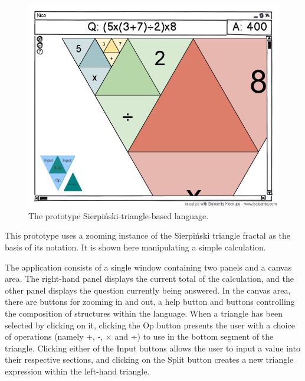\documentclass[12pt,twoside,notitlepage,xetex]{report}
\begin{document}
\begin{figure}[H]
\begin{center}
\includegraphics[width=\textwidth]{figs/mockups/sierp/sierp_mockup_full.png}
\caption{The prototype Sierpiński-triangle-based language.}
\label{fig:ProtoTri}
\end{center}
\end{figure}

This prototype uses a zooming instance of the Sierpiński triangle fractal as
the basis of its notation.  It is shown here manipulating a simple calculation.

The application consists of a single window containing two panels and a canvas
area.  The right-hand panel displays the current total of the calculation,
and the other panel displays the question currently being answered.  In the
canvas area, there are buttons for zooming in and out, a help button and
buttons controlling the composition of structures within the language.  When a
triangle has been selected by clicking on it, clicking the {\sfapp Op} button
presents the user with a choice of operations (namely +, -, × and ÷) to use in
the bottom segment of the triangle.  Clicking either of the {\sfapp Input}
buttons allows the user to input a value into their respective sections, and
clicking on the {\sfapp Split} button creates a new triangle expression within
the left-hand triangle.
\end{document}
